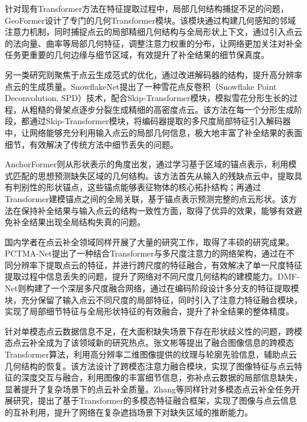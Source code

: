 针对现有Transformer方法在特征提取过程中，局部几何结构捕捉不足的问题，GeoFormer设计了专门的几何Transformer模块。该模块通过构建几何感知的邻域注意力机制，同时捕捉点云的局部精细几何结构与全局形状上下文，通过引入点云的法向量、曲率等局部几何特征，调整注意力权重的分布，让网络更加关注对补全任务更重要的几何边缘与细节区域，有效提升了补全结果的细节保真度\cite{chen2024geoformer}。

另一类研究则聚焦于点云生成范式的优化，通过改进解码器的结构，提升高分辨率点云的生成质量。SnowflakeNet提出了一种雪花点反卷积（Snowflake Point Deconvolution, SPD）技术，配合Skip-Transformer模块，模拟雪花分形生长的过程，从粗糙的骨架点逐步分裂生成精细的高密度点云。该方法在每一个分形生成阶段，都通过Skip-Transformer模块，将编码器提取的多尺度局部特征引入解码器中，让网络能够充分利用输入点云的局部几何信息，极大地丰富了补全结果的表面细节，有效解决了传统方法中细节丢失的问题\cite{xiang2021snowflakenet}。

AnchorFormer则从形状表示的角度出发，通过学习基于区域的锚点表示，利用模式匹配的思想预测缺失区域的几何结构。该方法首先从输入的残缺点云中，提取具有判别性的形状锚点，这些锚点能够表征物体的核心拓扑结构；再通过Transformer建模锚点之间的全局关联，基于锚点表示预测完整的点云形状。该方法在保持补全结果与输入点云的结构一致性方面，取得了优异的效果，能够有效避免补全结果出现全局结构失真的问题\cite{chen2023anchorformer}。

国内学者在点云补全领域同样开展了大量的研究工作，取得了丰硕的研究成果。PCTMA-Net提出了一种结合Transformer与多尺度注意力的网络架构，通过在不同分辨率下提取点云的特征，并进行跨尺度的特征融合，有效解决了单一尺度特征提取过程中信息丢失的问题，提升了网络对不同尺度几何结构的建模能力\cite{lin2023pctmanet}。DMF-Net则构建了一个深层多尺度融合网络，通过在编码阶段设计多分支的特征提取模块，充分保留了输入点云不同尺度的局部特征，同时引入了注意力特征融合模块，实现了局部细节特征与全局形状特征的有效融合，提升了补全结果的整体精度\cite{yang2022dmfnet}。

针对单模态点云数据信息不足，在大面积缺失场景下存在形状歧义性的问题，跨模态点云补全成为了该领域新的研究热点。张文彬等提出了融合图像信息的跨模态Transformer算法，利用高分辨率二维图像提供的纹理与轮廓先验信息，辅助点云几何结构的恢复。该方法设计了跨模态注意力融合模块，实现了图像特征与点云特征的深度交互与融合，利用图像的丰富细节信息，弥补点云数据的局部信息缺失，显著提升了复杂场景下的点云补全质量\cite{zhang2023crossmodal}。Zhang等同样针对多模态点云补全任务开展研究，提出了基于Transformer的多模态特征融合框架，实现了图像与点云信息的互补利用，提升了网络在复杂遮挡场景下对缺失区域的推断能力\cite{zhang2022multimodal}。

